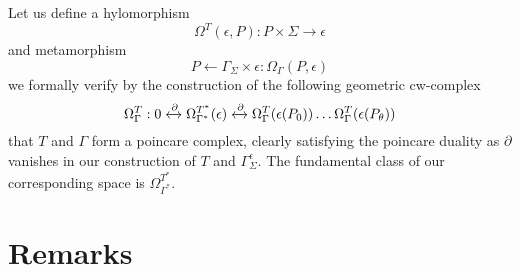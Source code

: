 \documentclass{article}
\begin{document}
Let us define a hylomorphism
\begin{equation} \label{eq1}
\Omega^T(\epsilon, P): P \times \Sigma \rightarrow \epsilon
\end{equation} \label{eq1}
and metamorphism
\begin{equation} \label{eq1}
P \leftarrow \Gamma_\Sigma \times \epsilon :\Omega_\Gamma(P, \epsilon)
\end{equation} \label{eq1}
we formally verify by the construction of the following geometric cw-complex
\begin{equation} \label{eq1}
\Omega^T_\Gamma: 0 \xleftrightarrow{\partial} \Omega^{T^*}_{\Gamma^*}(\epsilon) \xleftrightarrow{\partial}  \Omega^T_\Gamma (\epsilon(P_0)) \dots \Omega^T_\Gamma (\epsilon(P_\theta))
\end{equation} \label{eq1}
that $T$ and $\Gamma$ form a poincare complex, clearly satisfying the poincare duality as $\partial$ vanishes in our construction of $T$ and $\Gamma^\epsilon_\Sigma$. The fundamental class of our corresponding space is $\Omega^{T^*}_{\Gamma^*}$.

\section{Remarks}
 

\end{document}
